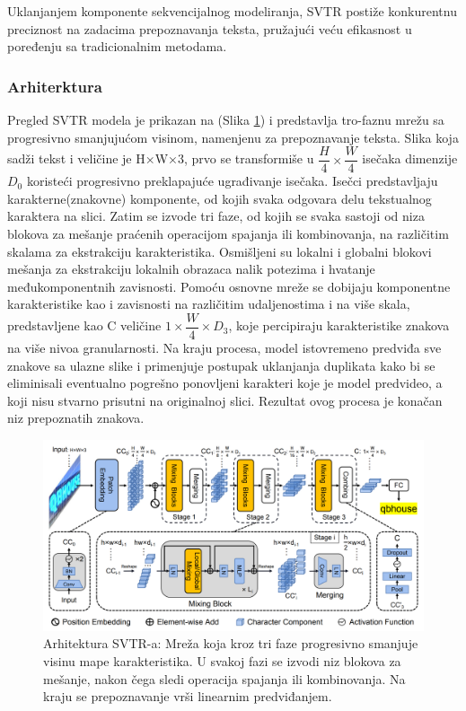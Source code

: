 \documentclass[a4paper,12pt]{article}
\begin{document}
	Uklanjanjem komponente sekvencijalnog modeliranja, SVTR postiže konkurentnu preciznost na zadacima prepoznavanja teksta, pružajući veću efikasnost u poređenju sa tradicionalnim metodama.
	
	\subsubsection{Arhiterktura}

	Pregled SVTR modela je prikazan na (Slika \ref{fig:svtr-architecture}) i predstavlja tro-faznu mrežu sa progresivno smanjujućom visinom, namenjenu za prepoznavanje teksta. Slika koja sadži tekst i veličine je H×W×3, prvo se transformiše u \(\dfrac{H}{4} \times \dfrac{W}{4}\) isečaka dimenzije \(D_0\) koristeći progresivno preklapajuće ugrađivanje isečaka. Isečci predstavljaju karakterne(znakovne) komponente, od kojih svaka odgovara delu tekstualnog karaktera na slici. Zatim se izvode tri faze, od kojih se svaka sastoji od niza blokova za mešanje praćenih operacijom spajanja ili kombinovanja, na različitim skalama za ekstrakciju karakteristika. Osmišljeni su lokalni i globalni blokovi mešanja za ekstrakciju lokalnih obrazaca nalik potezima i hvatanje međukomponentnih zavisnosti. Pomoću osnovne mreže se dobijaju komponentne karakteristike kao i zavisnosti na različitim udaljenostima i na više skala, predstavljene kao C veličine \(1 \times \dfrac{W}{4} \times D_3\), koje percipiraju karakteristike znakova na više nivoa granularnosti. Na kraju procesa, model istovremeno predviđa sve znakove sa ulazne slike i primenjuje postupak uklanjanja duplikata kako bi se eliminisali eventualno pogrešno ponovljeni karakteri koje je model predvideo, a koji nisu stvarno prisutni na originalnoj slici. Rezultat ovog procesa je konačan niz prepoznatih znakova.

	\begin{figure}[H]
		\centering
		\includegraphics[width=\textwidth]{assets/svtr-architecture.png}
		\caption{Arhitektura SVTR-a: Mreža koja kroz tri faze progresivno smanjuje visinu mape karakteristika. U svakoj fazi se izvodi niz blokova za mešanje, nakon čega sledi operacija spajanja ili kombinovanja. Na kraju se prepoznavanje vrši linearnim predviđanjem.}
		\label{fig:svtr-architecture}
	\end{figure}
	
\end{document}
